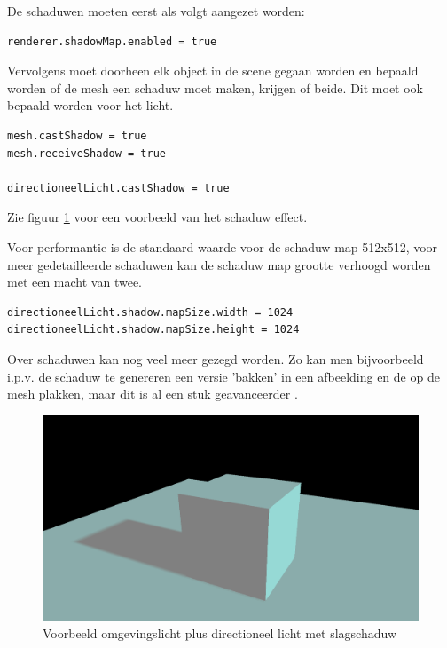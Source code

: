 De schaduwen moeten eerst als volgt aangezet worden:

\begin{lstlisting}
renderer.shadowMap.enabled = true
\end{lstlisting}

Vervolgens moet doorheen elk object in de scene gegaan worden en bepaald worden of de mesh een schaduw moet maken, krijgen of beide. Dit moet ook bepaald worden voor het licht.

\begin{lstlisting}
mesh.castShadow = true
mesh.receiveShadow = true

directioneelLicht.castShadow = true
\end{lstlisting}

Zie figuur \ref{fig:shadow} voor een voorbeeld van het schaduw effect.

Voor performantie is de standaard waarde voor de schaduw map 512x512, voor meer gedetailleerde schaduwen kan de schaduw map grootte verhoogd worden met een macht van twee.

\begin{lstlisting}
directioneelLicht.shadow.mapSize.width = 1024
directioneelLicht.shadow.mapSize.height = 1024
\end{lstlisting}

Over schaduwen kan nog veel meer gezegd worden. Zo kan men bijvoorbeeld i.p.v. de schaduw te genereren een versie 'bakken' in een afbeelding en de op de mesh plakken, maar dit is al een stuk geavanceerder \autocite{Simon2023}.

\begin{figure}
	\centering
	\includegraphics[width=1\linewidth]{graphics/shadow}
	\caption[Voorbeeld omgevingslicht plus directioneel licht met slagschaduw]{Voorbeeld omgevingslicht plus directioneel licht met slagschaduw}
	\label{fig:shadow}
\end{figure}

